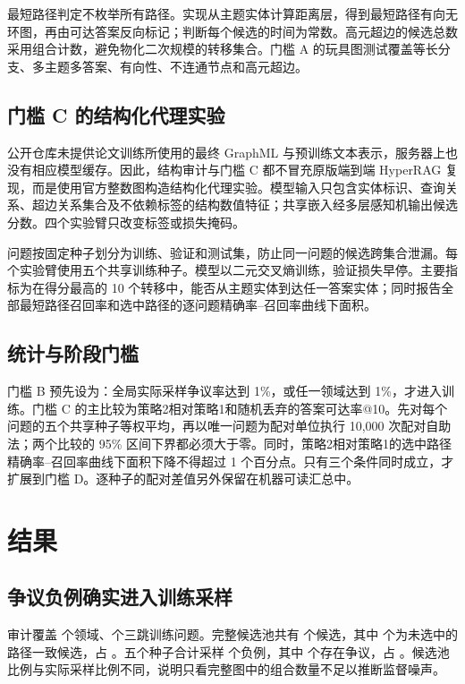 \documentclass[UTF8,11pt]{ctexart}
\begin{document}
最短路径判定不枚举所有路径。实现从主题实体计算距离层，得到最短路径有向无环图，再由可达答案反向标记；判断每个候选的时间为常数。高元超边的候选总数采用组合计数，避免物化二次规模的转移集合。门槛 A 的玩具图测试覆盖等长分支、多主题多答案、有向性、不连通节点和高元超边。

\subsection{门槛 C 的结构化代理实验}

公开仓库未提供论文训练所使用的最终 GraphML 与预训练文本表示，服务器上也没有相应模型缓存。因此，结构审计与门槛 C 都不冒充原版端到端 HyperRAG 复现，而是使用官方整数图构造结构化代理实验。模型输入只包含实体标识、查询关系、超边关系集合及不依赖标签的结构数值特征；共享嵌入经多层感知机输出候选分数。四个实验臂只改变标签或损失掩码。

问题按固定种子划分为训练、验证和测试集，防止同一问题的候选跨集合泄漏。每个实验臂使用五个共享训练种子。模型以二元交叉熵训练，验证损失早停。主要指标为在得分最高的 10 个转移中，能否从主题实体到达任一答案实体；同时报告全部最短路径召回率和选中路径的逐问题精确率--召回率曲线下面积。

\subsection{统计与阶段门槛}

门槛 B 预先设为：全局实际采样争议率达到 1\%，或任一领域达到 1\%，才进入训练。门槛 C 的主比较为策略2相对策略1和随机丢弃的答案可达率@10。先对每个问题的五个共享种子等权平均，再以唯一问题为配对单位执行 10,000 次配对自助法；两个比较的 95\% 区间下界都必须大于零。同时，策略2相对策略1的选中路径精确率--召回率曲线下面积下降不得超过 1 个百分点。只有三个条件同时成立，才扩展到门槛 D。逐种子的配对差值另外保留在机器可读汇总中。

\section{结果}

\subsection{争议负例确实进入训练采样}

审计覆盖 \AuditDomainCount 个领域、\AuditQueryCount 个三跳训练问题。完整候选池共有 \CandidateCount 个候选，其中 \DisputedCandidateCount 个为未选中的路径一致候选，占 \CandidateRate。五个种子合计采样 \SampledCount 个负例，其中 \DisputedSampledCount 个存在争议，占 \SampledRate。候选池比例与实际采样比例不同，说明只看完整图中的组合数量不足以推断监督噪声。
\end{document}
